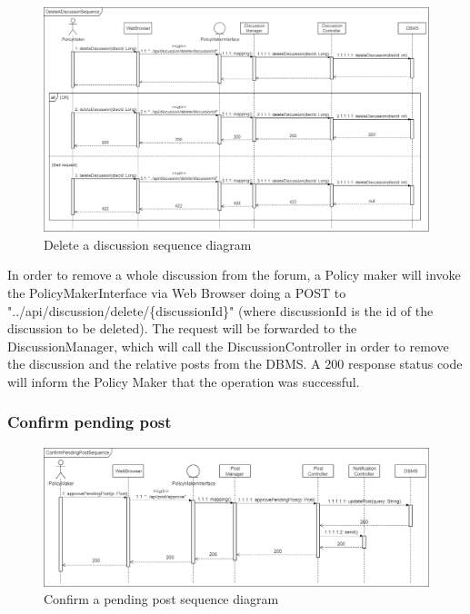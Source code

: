 \begin{figure}[h!]
        \centering
        \includegraphics[scale=0.25]{images/runtime_view/delete_discussion_runtime_view_diagram.png}
        \caption{Delete a discussion sequence diagram}
        \label{fig:delete_a_discussion_sequence_diagram}
\end{figure}
\FloatBarrier

In order to remove a whole discussion from the forum, a Policy maker will invoke the PolicyMakerInterface via Web Browser doing a POST to "../api/discussion/delete/\{discussionId\}" (where discussionId is the id of the discussion to be deleted). The request will be forwarded to the DiscussionManager, which will call the DiscussionController in order to remove the discussion and the relative posts from the DBMS. A 200 response status code will inform the Policy Maker that the operation was successful.

\subsubsection{Confirm pending post}

\begin{figure}[h!]
        \centering
        \includegraphics[scale=0.25]{images/runtime_view/confirm_pending_post_runtime_view_diagram.png}
        \caption{Confirm a pending post sequence diagram}
        \label{fig:confirm_pending_post_sequence_diagram}
\end{figure}
\FloatBarrier

